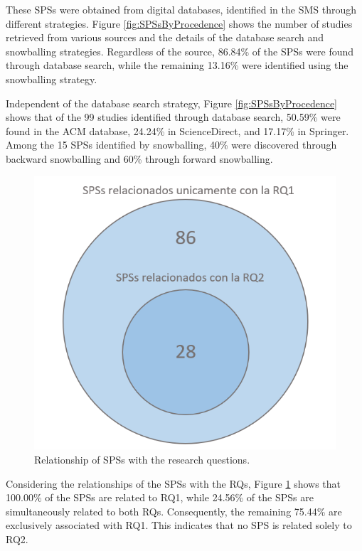 These SPSs were obtained from digital databases, identified in the SMS through different strategies. Figure \ref{fig:SPSsByProcedence} shows the number of studies retrieved from various sources and the details of the database search and snowballing strategies. Regardless of the source, 86.84\% of the SPSs were found through database search, while the remaining 13.16\% were identified using the snowballing strategy.

Independent of the database search strategy, Figure \ref{fig:SPSsByProcedence} shows that of the 99 studies identified through database search, 50.59\% were found in the ACM database, 24.24\% in ScienceDirect, and 17.17\% in Springer. Among the 15 SPSs identified by snowballing, 40\% were discovered through backward snowballing and 60\% through forward snowballing.

\begin{figure}[htbp]
	\centering
	\vspace{10pt}
	\includegraphics[scale=0.7]{resources/figures/Venn.png}
	\vspace{6pt}
	\caption{Relationship of SPSs with the research questions.}
	\label{fig:SPSsByRQs}
\end{figure}

Considering the relationships of the SPSs with the RQs, Figure \ref{fig:SPSsByRQs} shows that 100.00\% of the SPSs are related to RQ1, while 24.56\% of the SPSs are simultaneously related to both RQs. Consequently, the remaining 75.44\% are exclusively associated with RQ1. This indicates that no SPS is related solely to RQ2.

